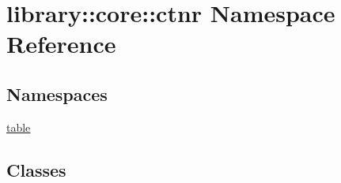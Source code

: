 \hypertarget{namespacelibrary_1_1core_1_1ctnr}{}\section{library\+:\+:core\+:\+:ctnr Namespace Reference}
\label{namespacelibrary_1_1core_1_1ctnr}
\subsection*{Namespaces}
\begin{DoxyCompactItemize}
\item 
 \hyperlink{namespacelibrary_1_1core_1_1ctnr_1_1table}{table}
\end{DoxyCompactItemize}
\subsection*{Classes}
